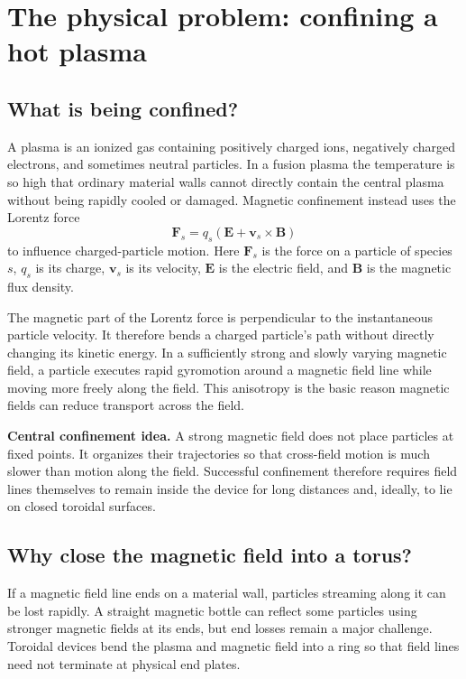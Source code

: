 \section{The physical problem: confining a hot plasma}
\label{sec:physical_picture}

\subsection{What is being confined?}
A plasma is an ionized gas containing positively charged ions, negatively charged electrons, and sometimes neutral particles. In a fusion plasma the temperature is so high that ordinary material walls cannot directly contain the central plasma without being rapidly cooled or damaged. Magnetic confinement instead uses the Lorentz force
\begin{equation}
\mathbf F_s=q_s\left(\mathbf E+\mathbf v_s\times\mathbf B\right)
\label{eq:lorentz_force}
\end{equation}
to influence charged-particle motion. Here $\mathbf F_s$ is the force on a particle of species $s$, $q_s$ is its charge, $\mathbf v_s$ is its velocity, $\mathbf E$ is the electric field, and $\mathbf B$ is the magnetic flux density.

The magnetic part of the Lorentz force is perpendicular to the instantaneous particle velocity. It therefore bends a charged particle's path without directly changing its kinetic energy. In a sufficiently strong and slowly varying magnetic field, a particle executes rapid gyromotion around a magnetic field line while moving more freely along the field. This anisotropy is the basic reason magnetic fields can reduce transport across the field.

\begin{physicsbox}
\textbf{Central confinement idea.} A strong magnetic field does not place particles at fixed points. It organizes their trajectories so that cross-field motion is much slower than motion along the field. Successful confinement therefore requires field lines themselves to remain inside the device for long distances and, ideally, to lie on closed toroidal surfaces.
\end{physicsbox}

\subsection{Why close the magnetic field into a torus?}
If a magnetic field line ends on a material wall, particles streaming along it can be lost rapidly. A straight magnetic bottle can reflect some particles using stronger magnetic fields at its ends, but end losses remain a major challenge. Toroidal devices bend the plasma and magnetic field into a ring so that field lines need not terminate at physical end plates.

